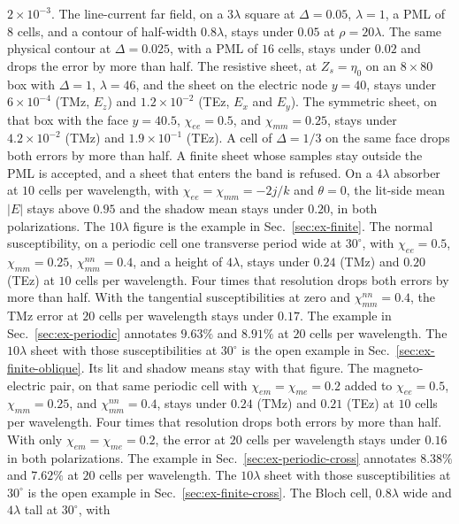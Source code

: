 \documentclass[11pt,a4paper]{article}
\begin{document}
$2\times 10^{-3}$.
The line-current far field, on a $3\lambda$ square at $\Delta=0.05$,
$\lambda=1$, a PML of $8$ cells, and a contour of half-width $0.8\lambda$,
stays under $0.05$ at $\rho=20\lambda$. The same physical contour at
$\Delta=0.025$, with a PML of $16$ cells, stays under $0.02$ and drops
the error by more than half.
The resistive sheet, at $Z_s=\eta_0$ on an
$8\times 80$ box with $\Delta=1$, $\lambda=46$, and the sheet on the
electric node $y=40$, stays under $6\times 10^{-4}$ (TMz, $E_z$) and
$1.2\times 10^{-2}$ (TEz, $E_x$ and $E_y$). The symmetric sheet, on that
box with the face $y=40.5$, $\chi_{ee}=0.5$, and $\chi_{mm}=0.25$, stays
under $4.2\times 10^{-2}$ (TMz) and $1.9\times 10^{-1}$ (TEz). A cell of
$\Delta=1/3$ on the same face drops both errors by more than half. A finite
sheet whose samples stay outside the PML is accepted, and a sheet that
enters the band is refused. On a $4\lambda$ absorber at $10$ cells per
wavelength, with $\chi_{ee}=\chi_{mm}=-2j/k$ and $\theta=0$, the lit-side
mean $|E|$ stays above $0.95$ and the shadow mean stays under $0.20$, in
both polarizations. The $10\lambda$ figure is the example in
Sec.~\ref{sec:ex-finite}. The normal susceptibility, on a periodic cell
one transverse period wide at $30^\circ$, with $\chi_{ee}=0.5$,
$\chi_{mm}=0.25$, $\chi_{mm}^{nn}=0.4$, and a height of $4\lambda$, stays
under $0.24$ (TMz) and $0.20$ (TEz) at $10$ cells per wavelength. Four
times that resolution drops both errors by more than half. With the
tangential susceptibilities at zero and $\chi_{mm}^{nn}=0.4$, the TMz
error at $20$ cells per wavelength stays under $0.17$. The example in
Sec.~\ref{sec:ex-periodic} annotates $9.63\%$ and $8.91\%$ at $20$ cells
per wavelength. The $10\lambda$ sheet with those susceptibilities at
$30^\circ$ is the open example in Sec.~\ref{sec:ex-finite-oblique}. Its
lit and shadow means stay with that figure. The magneto-electric pair, on
that same periodic cell with $\chi_{em}=\chi_{me}=0.2$ added to
$\chi_{ee}=0.5$, $\chi_{mm}=0.25$, and $\chi_{mm}^{nn}=0.4$, stays under
$0.24$ (TMz) and $0.21$ (TEz) at $10$ cells per wavelength. Four times
that resolution drops both errors by more than half. With only
$\chi_{em}=\chi_{me}=0.2$, the error at $20$ cells per wavelength stays
under $0.16$ in both polarizations. The example in
Sec.~\ref{sec:ex-periodic-cross} annotates $8.38\%$ and $7.62\%$ at $20$
cells per wavelength. The $10\lambda$ sheet with those susceptibilities
at $30^\circ$ is the open example in Sec.~\ref{sec:ex-finite-cross}. The
Bloch cell, $0.8\lambda$ wide and $4\lambda$ tall at $30^\circ$, with
\end{document}
